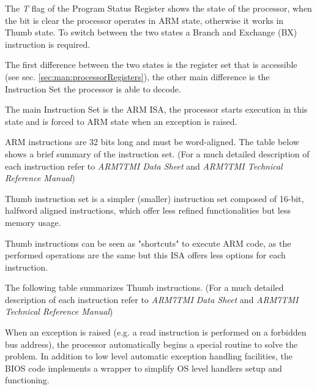 

The \emph{T} flag of the Program Status Register shows the state of the processor, when the bit is clear the processor operates in ARM state, otherwise it works in Thumb state. To switch between the two states a Branch and Exchange (BX) instruction is required.

The first difference between the two states is the register set that is accessible (see sec. \ref{sec:man:processorRegisters}), the other main difference is the Instruction Set the processor is able to decode.


The main Instruction Set is the ARM ISA, the processor starts execution in this state and is forced to ARM state when an exception is raised.

ARM instructions are 32 bits long and must be word-aligned. The table below shows a brief summary of the instruction set. (For a much detailed description of each instruction refer to \emph{ARM7TMI Data Sheet} and \emph{ARM7TMI Technical Reference Manual})



Thumb instruction set is a simpler (smaller) instruction set composed of 16-bit, halfword aligned instructions, which offer less refined functionalities but less memory usage.

Thumb instructions can be seen as "shortcuts" to execute ARM code, as the performed operations are the same but this ISA offers less options for each instruction.

The following table summarizes Thumb instructions. (For a much detailed description of each instruction refer to \emph{ARM7TMI Data Sheet} and \emph{ARM7TMI Technical Reference Manual})


\label{sec:man:exceptionHandling}

When an exception is raised (e.g. a read instruction is performed on a forbidden bus address), the processor automatically begins a special routine to solve the problem. 
In addition to low level automatic exception handling facilities, the BIOS code implements a wrapper to simplify OS level handlers setup and functioning.

\label{sec:man:hardwareExceptions}

